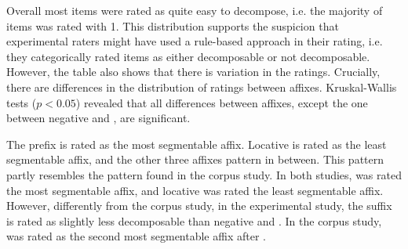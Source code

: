 \begin{table}
	\caption{Semantic Transparency Rating  by affix\label{tbl:Exp distribution semantic transparency rating}}
\end{table}

Overall most  items were rated as quite easy to decompose, i.e. the majority of items was rated with 1. This distribution supports the suspicion that experimental raters might have used a rule-based approach in their rating, i.e. they categorically rated items as either decomposable or not decomposable. 
However, the table also shows that there is variation in the ratings. 
Crucially, there are differences in the distribution of ratings between affixes. Kruskal-Wallis tests ($p<0.05$) revealed that all differences between affixes, except the one between negative  and , are significant.



The prefix  is rated as the most segmentable affix. 
 Locative  is rated as the least segmentable affix, and the other three affixes pattern in between. 
  This pattern partly resembles the pattern found in the corpus study. In both studies,  was rated the most segmentable affix, and locative  was rated the least segmentable affix. 
 However, differently from the corpus study, in the experimental study, the suffix  is rated as slightly less decomposable than negative  and . In the corpus study,  was rated as the second most segmentable affix after .\largerpage


